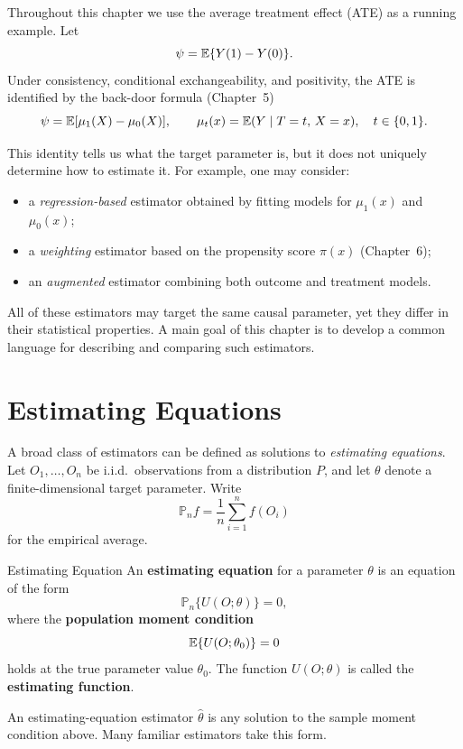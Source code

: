 \documentclass[master.tex]{subfiles}
\begin{document}
Throughout this chapter we use the average treatment effect (ATE) as a
running example.  Let
\[
  \psi = \mathbb{E}\{Y(1) - Y(0)\}.
\]
Under consistency, conditional exchangeability, and positivity, the ATE
is identified by the back-door formula (Chapter~5)
\[
  \psi = \mathbb{E}[\mu_1(X) - \mu_0(X)],
  \qquad
  \mu_t(x) = \mathbb{E}(Y \mid T=t,\, X=x),\quad t\in\{0,1\}.
\]

This identity tells us what the target parameter is, but it does not
uniquely determine how to estimate it.  For example, one may consider:
\begin{itemize}
  \item a \emph{regression-based} estimator obtained by fitting models
    for $\mu_1(x)$ and $\mu_0(x)$;
  \item a \emph{weighting} estimator based on the propensity score
    $\pi(x)$ (Chapter~6);
  \item an \emph{augmented} estimator combining both outcome and
    treatment models.
\end{itemize}
All of these estimators may target the same causal parameter, yet they
differ in their statistical properties.  A main goal of this chapter is
to develop a common language for describing and comparing such
estimators.

\section{Estimating Equations}
\label{w9:sec:ee}

A broad class of estimators can be defined as solutions to
\emph{estimating equations}.  Let $O_1,\dots,O_n$ be i.i.d.\
observations from a distribution $P$, and let $\theta$ denote a
finite-dimensional target parameter.  Write
\[
  \mathbb{P}_n f = \frac{1}{n}\sum_{i=1}^n f(O_i)
\]
for the empirical average.

\begin{defn}{Estimating Equation}
\label{w9:defn:ee}
An \textbf{estimating equation} for a parameter $\theta$ is an equation
of the form
\[
  \mathbb{P}_n\{U(O;\theta)\} = 0,
\]
where the \textbf{population moment condition}
\[
  \mathbb{E}\{U(O;\theta_0)\} = 0
\]
holds at the true parameter value $\theta_0$.  The function
$U(O;\theta)$ is called the \textbf{estimating function}.
\end{defn}

An estimating-equation estimator $\hat\theta$ is any solution to the
sample moment condition above.  Many familiar estimators take this form.
\end{document}
